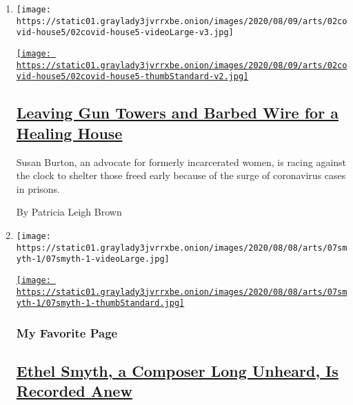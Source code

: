 \begin{enumerate}
\def\labelenumi{\arabic{enumi}.}
\item
  \texttt{[image: https://static01.graylady3jvrrxbe.onion/images/2020/08/09/arts/02covid-house5/02covid-house5-videoLarge-v3.jpg]}

  \href{/2020/08/07/arts/design/susan-burton-reentry-project-prisons-virus.html}{\texttt{[image: https://static01.graylady3jvrrxbe.onion/images/2020/08/09/arts/02covid-house5/02covid-house5-thumbStandard-v2.jpg]}}

  \hypertarget{leaving-gun-towers-and-barbed-wire-for-a-healing-house}{%
  \subsection{\texorpdfstring{\href{/2020/08/07/arts/design/susan-burton-reentry-project-prisons-virus.html}{Leaving
  Gun Towers and Barbed Wire for a Healing
  House}}{Leaving Gun Towers and Barbed Wire for a Healing House}}\label{leaving-gun-towers-and-barbed-wire-for-a-healing-house}}

  Susan Burton, an advocate for formerly incarcerated women, is racing
  against the clock to shelter those freed early because of the surge of
  coronavirus cases in prisons.

  By Patricia Leigh Brown
\item
  \texttt{[image: https://static01.graylady3jvrrxbe.onion/images/2020/08/08/arts/07smyth-1/07smyth-1-videoLarge.jpg]}

  \href{/2020/08/07/arts/music/ethel-smyth-prison-chandos.html}{\texttt{[image: https://static01.graylady3jvrrxbe.onion/images/2020/08/08/arts/07smyth-1/07smyth-1-thumbStandard.jpg]}}

  \hypertarget{my-favorite-page}{%
  \subsubsection{My Favorite Page}\label{my-favorite-page}}

  \hypertarget{ethel-smyth-a-composer-long-unheard-is-recorded-anew}{%
  \subsection{\texorpdfstring{\href{/2020/08/07/arts/music/ethel-smyth-prison-chandos.html}{Ethel
  Smyth, a Composer Long Unheard, Is Recorded
  Anew}}{Ethel Smyth, a Composer Long Unheard, Is Recorded Anew}}\label{ethel-smyth-a-composer-long-unheard-is-recorded-anew}}


\end{enumerate}
